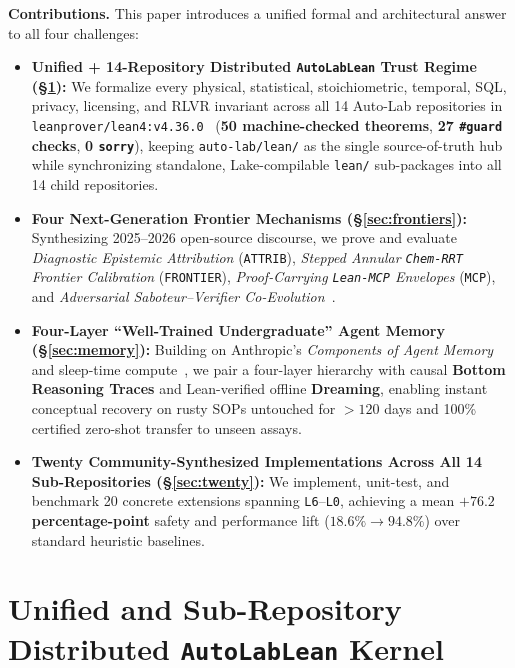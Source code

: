 \documentclass[10pt,letterpaper]{article}
\begin{document}
\textbf{Contributions.} This paper introduces a unified formal and architectural answer to all four challenges:
\begin{itemize}[leftmargin=1.5em, itemsep=2pt, topsep=2pt]
  \item \textbf{Unified + 14-Repository Distributed \texttt{AutoLabLean} Trust Regime (\S\ref{sec:kernel}):} We formalize every physical, statistical, stoichiometric, temporal, SQL, privacy, licensing, and RLVR invariant across all 14 Auto-Lab repositories in \texttt{leanprover/lean4:v4.36.0}~\cite{moura2021lean4} (\textbf{50 machine-checked theorems}, \textbf{27 \texttt{\#guard} checks}, \textbf{0 \texttt{sorry}}), keeping \texttt{auto-lab/lean/} as the single source-of-truth hub while synchronizing standalone, Lake-compilable \texttt{lean/} sub-packages into all 14 child repositories.
  \item \textbf{Four Next-Generation Frontier Mechanisms (\S\ref{sec:frontiers}):} Synthesizing 2025--2026 open-source discourse, we prove and evaluate \emph{Diagnostic Epistemic Attribution} (\texttt{ATTRIB}), \emph{Stepped Annular \texttt{Chem-RRT} Frontier Calibration} (\texttt{FRONTIER}), \emph{Proof-Carrying \texttt{Lean-MCP} Envelopes} (\texttt{MCP}), and \emph{Adversarial Saboteur--Verifier Co-Evolution}~\cite{lean4agent2026}.
  \item \textbf{Four-Layer ``Well-Trained Undergraduate'' Agent Memory (\S\ref{sec:memory}):} Building on Anthropic's \emph{Components of Agent Memory}~\cite{martin2026memory} and sleep-time compute~\cite{lin2025sleeptime}, we pair a four-layer hierarchy with causal \textbf{Bottom Reasoning Traces} and Lean-verified offline \textbf{Dreaming}, enabling instant conceptual recovery on rusty SOPs untouched for $>120$ days and 100\% certified zero-shot transfer to unseen assays.
  \item \textbf{Twenty Community-Synthesized Implementations Across All 14 Sub-Repositories (\S\ref{sec:twenty}):} We implement, unit-test, and benchmark 20 concrete extensions spanning \texttt{L6}--\texttt{L0}, achieving a mean \textbf{$+76.2$ percentage-point} safety and performance lift ($18.6\% \to 94.8\%$) over standard heuristic baselines.
\end{itemize}

\section{Unified and Sub-Repository Distributed \texttt{AutoLabLean} Kernel}
\label{sec:kernel}
\end{document}
